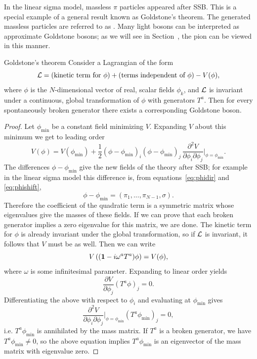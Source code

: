 In the linear sigma model, massless $\pi$ particles appeared after
SSB. This is a special example of a general result
known as Goldstone's theorem. The generated massless particles are
referred to as . 
Many light bosons can be interpreted
as approximate Goldstone bosons; as we will see in Section~,
the pion can be viewed in this manner.
\begin{theorem}{Goldstone's theorem}{}
Consider a Lagrangian of the form
$$
  \mathcal{L}=(\text{kinetic term for $\phi$})+
        (\text{terms independent of $\phi$})-V(\phi),
$$
where $\phi$ is the $N$-dimensional vector of real, scalar fields
$\phi_k$, and $\mathcal{L}$ is invariant under a continuous, global
transformation of $\phi$ with generators $T^a$. Then for every
spontaneously broken generator there exists a corresponding
Goldstone boson. 
\begin{proof}
  Let $\phi_\text{min}$ be a constant field minimizing $V$. Expanding
  $V$ about this minimum we get to leading order
  $$
    V(\phi)= V(\phi_\text{min})
     +\frac{1}{2}
      (\phi-\phi_\text{min})_i(\phi-\phi_\text{min})_j\,
      \frac{\partial^2 V}{\partial\phi_i\partial\phi_j}
       \Big|_{\phi=\phi_\text{min}}.
  $$
  The differences $\phi-\phi_\text{min}$ give the new fields of the
  theory after SSB; for example in the linear sigma model this difference
  is, from equations~\eqref{eq:phidir} and \eqref{eq:phishift},
  $$
    \phi-\phi_\text{min}=(\pi_1,...,\pi_{N-1},\sigma).
  $$
  Therefore the coefficient of the quadratic term is a symmetric matrix
  whose eigenvalues give the masses of these fields. If we can prove
  that each broken generator implies a zero eigenvalue for this matrix,
  we are done.
  The kinetic term for $\phi$ is already invariant under the global
  transformation, so if $\mathcal{L}$ is invariant, it follows that $V$ must
  be as well. Then we can write
  $$
    V\left(({\mathbf 1}-i\omega^aT^a)\phi\right)=V(\phi),
  $$
  where $\omega$ is some infinitesimal parameter. Expanding to linear
  order yields
  $$
    \frac{\partial V}{\partial\phi_j}(T^a\phi)_j=0.
  $$
  Differentiating the above with respect to $\phi_i$ and evaluating at
  $\phi_\text{min}$ gives
  $$
     \frac{\partial^2 V}{\partial\phi_i\partial\phi_j}
      \Big|_{\phi=\phi_\text{min}}(T^a\phi_\text{min})_j=0,
  $$
  i.e. $T^a\phi_\text{min}$ is annihilated by the mass matrix. 
  If $T^a$ is a broken generator, we have $T^a\phi_\text{min}\neq0$,
  so the above equation implies $T^a\phi_\text{min}$ is an
  eigenvector of the mass matrix with eigenvalue zero.
\end{proof}
\end{theorem}


